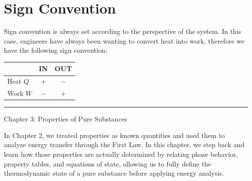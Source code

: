 \documentclass[12pt]{article}
\begin{document}
\section*{Sign Convention}
Sign convention is always set according to the perspective of the system. In this case, engineers have always been wanting to convert heat into work, therefore we have the following sign convention:
\begin{table}[H]
\centering
\renewcommand{\arraystretch}{1.5}
\begin{tabular}{|l|c|c|}
\hline
 & \textbf{IN} & \textbf{OUT} \\ \hline
Heat $Q$ & $+$ & $-$ \\ \hline
Work $W$ & $-$ & $+$ \\ \hline
\end{tabular}
\end{table}
\vspace{1em}
\noindent\hrule
\vspace{1em}
\newpage
\begin{center}
{\LARGE Chapter 3: Properties of Pure Substances\par}
\end{center}
In Chapter 2, we treated properties as known quantities and used them to analyze energy transfer through the First Law. In this chapter, we step back and learn how those properties are actually determined by relating phase behavior, property tables, and equations of state, allowing us to fully define the thermodynamic state of a pure substance before applying energy analysis.
\end{document}

